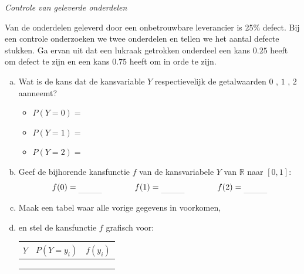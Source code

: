 \documentclass[a4paper,12pt, twoside]{article}
\begin{document}
\begin{oefening} {\em Controle van geleverde onderdelen}

  Van de onderdelen geleverd door een onbetrouwbare leverancier is 25\% defect. Bij een controle onderzoeken we twee onderdelen en tellen we het aantal defecte stukken.  Ga ervan uit dat een lukraak getrokken onderdeel een kans $0.25$ heeft om defect te zijn en een kans $0.75$ heeft om in orde te zijn.

  \begin{enumerate}[(a)]
  \item Wat is de kans dat de kansvariable $Y$ respectievelijk de getalwaarden $0$ , $1$ , $2$ aanneemt?
    \begin{itemize}
      \itemsep1em
    \item $P(Y=0)=$\arulefill
    \item $P(Y=1)=$\arulefill
    \item $P(Y=2)=$\arulefill
    \end{itemize}
  \item Geef de bijhorende kansfunctie $f$ van de kansvariabele $Y$ van $\mathbb{R}$ naar $[0,1]$:
    $$f(0)=\arule{1cm} \qquad\qquad f(1)=\arule{1cm} \qquad\qquad f(2)=\arule{1cm}$$
  \item Maak een tabel waar alle vorige gegevens in voorkomen,
  \item en stel de kansfunctie $f$ grafisch voor:\\
    \begin{minipage}{0.5\linewidth}
      \begin{center}
        \begin{tabular}{c|c|c}
          $Y$ & $P(Y=y_i)$ & $f(y_i)$\\
          \hline
          &\\
          &\\
          &\\
        \end{tabular}
      \end{center}
    \end{minipage}
    \begin{minipage}{0.5\linewidth}
      \begin{center}
      \end{center}
    \end{minipage}
  \end{enumerate}
\end{oefening}

\pagebreak
\end{document}
